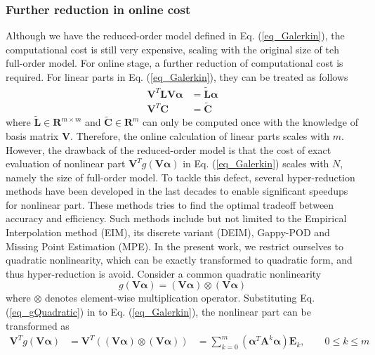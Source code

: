\documentclass[preprint, 10pt]{elsarticle}
\begin{document}
\subsubsection{Further reduction in online cost}
Although we have the reduced-order model defined in Eq. (\ref{eq_Galerkin}), the computational cost is still very expensive, scaling with the original size of teh full-order model. For online stage, a further reduction of  computational cost is required. For linear parts in Eq. (\ref{eq_Galerkin}), they can be treated as follows
\begin{equation}
\begin{aligned}
\mathbf{V}^T \mathbf{L} \mathbf{V} \pmb{\alpha}  &= \tilde {\mathbf{L}} \pmb{\alpha} \\
\mathbf{V}^T \mathbf{C}                          &= \tilde {\mathbf{C}}
\end{aligned}
\label{eq_ReductionLinear}
\end{equation}
where $\tilde {\mathbf{L}} \in \mathbf{R}^{m \times m}$ and $\tilde {\mathbf{C}} \in \mathbf{R}^{m} $ can only be computed once with the knowledge of basis matrix $\mathbf{V}$.
Therefore, the online calculation of linear parts scales with $m$. However, the drawback of the reduced-order model is that the cost of exact evaluation of nonlinear part $\mathbf{V}^T g \left( \mathbf{V} \pmb{\alpha} \right)$  in Eq. (\ref{eq_Galerkin}) scales with $N$, namely the size of full-order model. To tackle this defect, several hyper-reduction methods have been developed in the last decades to enable significant speedups for nonlinear part. These methods tries to find the optimal tradeoff between accuracy and efficiency. Such methods include but not limited to the Empirical Interpolation method (EIM), its
discrete variant (DEIM), Gappy-POD and Missing Point Estimation (MPE). In the present work, we restrict ourselves to quadratic nonlinearity, which can be exactly transformed to quadratic form, and thus hyper-reduction is avoid. Consider a common quadratic nonlinearity
\begin{equation}
g \left( \mathbf{V} \pmb{\alpha} \right)
=
\left( \mathbf{V} \pmb{\alpha} \right) \otimes \left( \mathbf{V} \pmb{\alpha} \right)
\label{eq_gQuadratic}
\end{equation}
where $\otimes$ denotes element-wise multiplication operator. Substituting Eq. (\ref{eq_gQuadratic}) in to Eq. (\ref{eq_Galerkin}), the nonlinear part can be transformed as
\begin{equation}
\begin{aligned}
\mathbf{V}^T
g \left( \mathbf{V} \pmb{\alpha} \right)
&=
\mathbf{V}^T
\left(
\left( \mathbf{V} \pmb{\alpha} \right) \otimes \left( \mathbf{V} \pmb{\alpha} \right)
\right)
&= \sum_{k=0}^{m} { \left( \pmb{\alpha}^T \mathbf{A}^k \pmb{\alpha} \right) \mathbf{E}_k }, \qquad 0 \le k \le m
\end{aligned}
\label{eq_ReductionNonlinear}
\end{equation}
\end{document}
